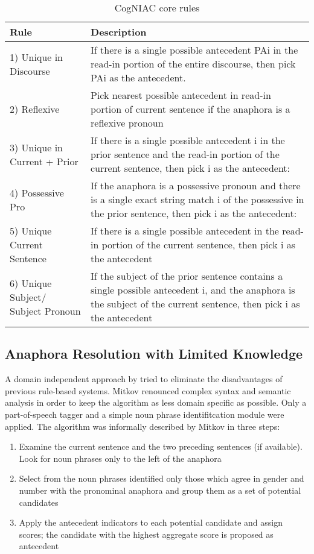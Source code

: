 \begin{table}[h]
    \begin{tabular}{| l |p{8cm} |}
    \hline
    Rule & Description \\ \hline
\hline
    1) Unique in Discourse & If there is a single possible antecedent PAi in the read-in portion of the entire discourse, then pick PAi as the antecedent. \\ \hline
    2) Reflexive & Pick nearest possible antecedent in read-in portion of current sentence if the anaphora is a reflexive pronoun \\ \hline
    3) Unique in Current + Prior & If there is a single possible antecedent i in the prior sentence and the read-in portion of the current sentence, then pick i as the antecedent: \\ \hline
    4) Possessive Pro & If the anaphora is a possessive pronoun and there is a single exact string match i of the possessive in the prior sentence, then pick i as the antecedent:  \\ \hline
    5) Unique Current Sentence & If there is a single possible antecedent in the read-in portion of the current sentence, then pick i as the antecedent  \\ \hline
    6) Unique Subject/ Subject Pronoun & If the subject of the prior sentence contains a single possible antecedent i, and the anaphora is the subject of the current sentence, then pick i as the antecedent \\ \hline
    \end{tabular}
  \caption{CogNIAC core rules}
     \label{table:cogniacRules}
\end{table}

\subsection{Anaphora Resolution with Limited Knowledge}
\label{anaphoraLimitedKnowledgeSection}

A domain independent approach by \cite{mitkov1998robust} tried to eliminate the disadvantages of previous rule-based systems. Mitkov renounced complex syntax and semantic analysis in order to keep the algorithm as less domain specific as possible. Only a part-of-speech tagger and a simple noun phrase identifitcation module were applied. The algorithm was informally described by Mitkov in three steps:
\begin{enumerate} 
\item Examine the current sentence and the two preceding sentences (if available). Look for noun phrases only to the left of the anaphora
\item Select from the noun phrases identified only those which agree in gender and number with the pronominal anaphora and group them as a set of potential candidates
\item Apply the antecedent indicators to each potential candidate and assign scores; the candidate with the highest aggregate score is proposed as antecedent
\end{enumerate}

